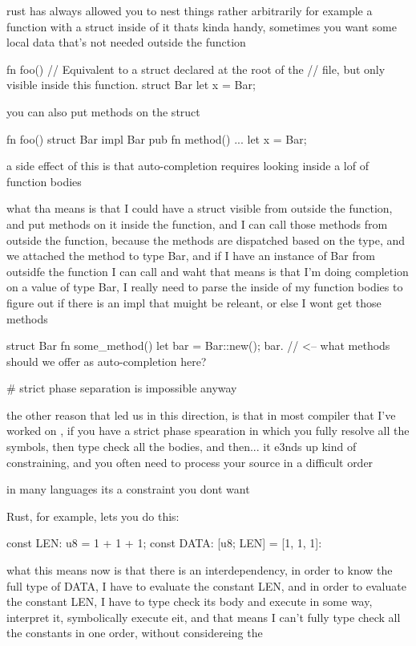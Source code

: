 \documentclass[12pt, a4paper]{report}
\begin{document}
rust has always allowed you to nest things rather arbitrarily
for example a function with a struct inside of it
thats kinda handy, sometimes you want some local data that's not needed outside the function

fn foo() {
  // Equivalent to a struct declared at the root of the
  // file, but only visible inside this function.
  struct Bar{}
  let x = Bar{};
}

you can also put methods on the struct

fn foo() {
  struct Bar{}
  impl Bar {
    pub fn method() { ... }
  }
  let x = Bar{};
}

a side effect of this is that auto-completion requires looking inside a lof of function bodies

what tha means is that I could have a struct visible from outside the function, and put methods on it inside the function, and I can call those methods from outside the function, because the methods are dispatched based on the type, and we attached the method to type Bar, and if I have an instance of Bar from outsidfe the function I can call
and waht that means is that I'm doing completion on a value of type Bar, I really need to parse the inside of my function bodies to figure out if there is an impl that muight be releant, or else I wont get those methods

struct Bar {}
fn some_method() {
  let bar = Bar::new();
  bar. // <-- what methods should we offer as auto-completion here?
}

# strict phase separation is impossible anyway

the other reason that led us in this direction, is that in most compiler that I've worked on , if you have a strict phase spearation in which you fully resolve all the symbols, then type check all the bodies, and then... it e3nds up kind of constraining, and you often need to process your source in a difficult order

in many languages its a constraint you dont want

Rust, for example, lets you do this:

const LEN: u8 = 1 + 1 + 1;
const DATA: [u8; LEN] = [1, 1, 1]:

what this means now is that there is an interdependency, in order to know the full type of DATA, I have to evaluate the constant LEN, and in order to evaluate the constant LEN, I have to type check its body and execute in some way, interpret it, symbolically execute eit, and that means I can't fully type check all the constants in one order, without considereing the
\end{document}
